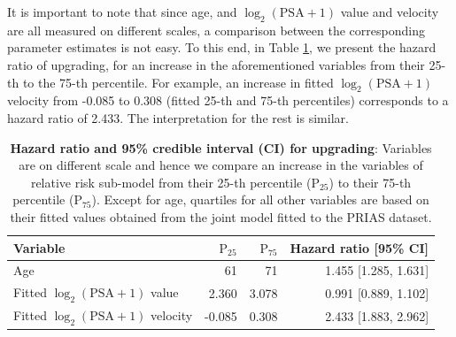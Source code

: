 It is important to note that since age, and ${\log_2 (\mbox{PSA} + 1)}$ value and velocity are all measured on different scales, a comparison between the corresponding parameter estimates is not easy. To this end, in Table \ref{tab:PSA_survival_easy}, we present the hazard ratio of upgrading, for an increase in the aforementioned variables from their 25-th to the 75-th percentile. For example, an increase in fitted $\log_2 (\mbox{PSA} + 1)$ velocity from -0.085 to 0.308 (fitted 25-th and 75-th percentiles) corresponds to a hazard ratio of 2.433. The interpretation for the rest is similar.

\begin{table}
\small\sf\centering
\caption{\textbf{Hazard ratio and 95\% credible interval (CI) for upgrading}: Variables are on different scale and hence we compare an increase in the variables of relative risk sub-model from their 25-th percentile ($\mbox{P}_{25}$) to their 75-th percentile ($\mbox{P}_{75}$). Except for age, quartiles for all other variables are based on their fitted values obtained from the joint model fitted to the PRIAS dataset.}
\label{tab:PSA_survival_easy}
\begin{tabular}{lrrr}
\hline
Variable                      & $\mbox{P}_{25}$   & $\mbox{P}_{75}$ & Hazard ratio [95\% CI] \\
\hline
Age & 61 & 71 & 1.455 [1.285, 1.631] \\
Fitted $\log_2 (\mbox{PSA} + 1)$ value & 2.360 & 3.078 & 0.991 [0.889, 1.102] \\
Fitted $\log_2 (\mbox{PSA} + 1)$ velocity & -0.085 & 0.308 & 2.433 [1.883, 2.962] \\
\hline
\end{tabular}
\end{table}

